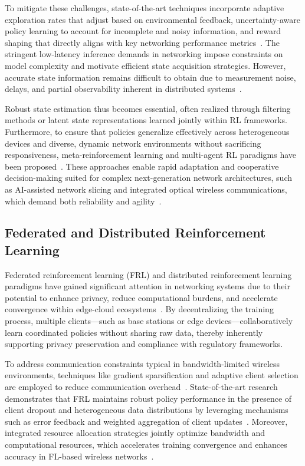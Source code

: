 \documentclass[sigconf]{acmart}
\begin{document}
To mitigate these challenges, state-of-the-art techniques incorporate adaptive exploration rates that adjust based on environmental feedback, uncertainty-aware policy learning to account for incomplete and noisy information, and reward shaping that directly aligns with key networking performance metrics~\cite{ref3,ref6}. The stringent low-latency inference demands in networking impose constraints on model complexity and motivate efficient state acquisition strategies. However, accurate state information remains difficult to obtain due to measurement noise, delays, and partial observability inherent in distributed systems~\cite{ref3,ref48}.

Robust state estimation thus becomes essential, often realized through filtering methods or latent state representations learned jointly within RL frameworks. Furthermore, to ensure that policies generalize effectively across heterogeneous devices and diverse, dynamic network environments without sacrificing responsiveness, meta-reinforcement learning and multi-agent RL paradigms have been proposed~\cite{ref14,ref6}. These approaches enable rapid adaptation and cooperative decision-making suited for complex next-generation network architectures, such as AI-assisted network slicing and integrated optical wireless communications, which demand both reliability and agility~\cite{ref6,ref14}.

\subsection{Federated and Distributed Reinforcement Learning}

Federated reinforcement learning (FRL) and distributed reinforcement learning paradigms have gained significant attention in networking systems due to their potential to enhance privacy, reduce computational burdens, and accelerate convergence within edge-cloud ecosystems~\cite{ref49,ref50}. By decentralizing the training process, multiple clients—such as base stations or edge devices—collaboratively learn coordinated policies without sharing raw data, thereby inherently supporting privacy preservation and compliance with regulatory frameworks.

To address communication constraints typical in bandwidth-limited wireless environments, techniques like gradient sparsification and adaptive client selection are employed to reduce communication overhead~\cite{ref49}. State-of-the-art research demonstrates that FRL maintains robust policy performance in the presence of client dropout and heterogeneous data distributions by leveraging mechanisms such as error feedback and weighted aggregation of client updates~\cite{ref49}. Moreover, integrated resource allocation strategies jointly optimize bandwidth and computational resources, which accelerates training convergence and enhances accuracy in FL-based wireless networks~\cite{ref50}.
\end{document}
